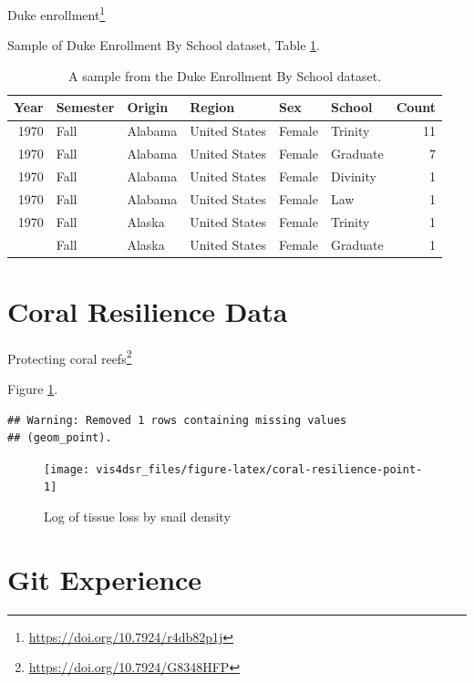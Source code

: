 \documentclass[
]{krantz}
\renewcommand{\href}[2]{#2\footnote{\url{#1}}}
\begin{document}
\href{https://doi.org/10.7924/r4db82p1j}{Duke enrollment}

Sample of Duke Enrollment By School dataset, Table \ref{tab:duke-school-tab}.

\begin{table}

\caption{\label{tab:duke-school-tab}A sample from the Duke Enrollment By School dataset.}
\centering
\begin{tabular}[t]{rlllllr}
\toprule
Year & Semester & Origin & Region & Sex & School & Count\\
\midrule
1970 & Fall & Alabama & United States & Female & Trinity & 11\\
1970 & Fall & Alabama & United States & Female & Graduate & 7\\
1970 & Fall & Alabama & United States & Female & Divinity & 1\\
1970 & Fall & Alabama & United States & Female & Law & 1\\
1970 & Fall & Alaska & United States & Female & Trinity & 1\\
\addlinespace
1970 & Fall & Alaska & United States & Female & Graduate & 1\\
\bottomrule
\end{tabular}
\end{table}

\hypertarget{coral-resilience-data}{%
\section*{Coral Resilience Data}\label{coral-resilience-data}}


\href{https://doi.org/10.7924/G8348HFP}{Protecting coral reefs}

Figure \ref{fig:coral-resilience-point}.

\begin{verbatim}
## Warning: Removed 1 rows containing missing values
## (geom_point).
\end{verbatim}

\begin{figure}
\texttt{[image: vis4dsr\_files/figure-latex/coral-resilience-point-1]} \caption{Log of tissue loss by snail density}\label{fig:coral-resilience-point}
\end{figure}

\hypertarget{git-experience}{%
\section*{Git Experience}\label{git-experience}}
\end{document}
